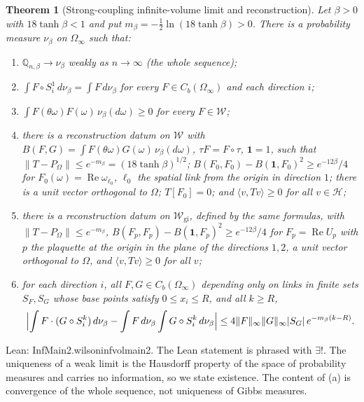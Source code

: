 \documentclass[11pt,a4paper]{article}
\newtheorem{theorem}{Theorem}[section]
\theoremstyle{definition}
\theoremstyle{remark}
\newcommand{\leanus}{\textunderscore\allowbreak{}}
\newcommand{\leandot}{.\allowbreak{}}
\newcommand{\lean}[1]{{\ttfamily\let\_\leanus #1}}
\renewcommand{\Re}{\operatorname{Re}}
\begin{document}
\begin{theorem}[Strong-coupling infinite-volume limit and reconstruction]\label{thm:infvol}
Let $\beta>0$ with $18\tanh\beta<1$ and put $m_\beta=-\tfrac12\ln(18\tanh\beta)>0$. There is a probability measure $\nu_\beta$ on $\Omega_\infty$ such that:
\begin{enumerate}[label=(\alph*),leftmargin=2em]
\item $\mathbb Q_{n,\beta}\to\nu_\beta$ weakly as $n\to\infty$ (the whole sequence);
\item $\int F\circ S_i^1\,d\nu_\beta=\int F\,d\nu_\beta$ for every $F\in C_b(\Omega_\infty)$ and each direction $i$;
\item $\int F(\theta\omega)F(\omega)\,\nu_\beta(d\omega)\ge0$ for every $F\in\mathcal W$;
\item there is a reconstruction datum on $\mathcal W$ with $B(F,G)=\int F(\theta\omega)G(\omega)\,\nu_\beta(d\omega)$, $\tau F=F\circ\tau$, $\mathbf 1=1$, such that $\|T-P_\Omega\|\le e^{-m_\beta}=(18\tanh\beta)^{1/2}$; $B(F_0,F_0)-B(\mathbf 1,F_0)^2\ge e^{-12\beta}/4$ for $F_0(\omega)=\Re\omega_{\ell_0}$, $\ell_0$ the spatial link from the origin in direction $1$; there is a unit vector orthogonal to $\Omega$; $T[F_0]=0$; and $\langle v,Tv\rangle\ge0$ for all $v\in\mathcal H$;
\item there is a reconstruction datum on $\mathcal W_{\mathrm{gi}}$, defined by the same formulas, with $\|T-P_\Omega\|\le e^{-m_\beta}$, $B(F_p,F_p)-B(\mathbf 1,F_p)^2\ge e^{-12\beta}/4$ for $F_p=\Re U_p$ with $p$ the plaquette at the origin in the plane of the directions $1,2$, a unit vector orthogonal to $\Omega$, and $\langle v,Tv\rangle\ge0$ for all $v$;
\item for each direction $i$, all $F,G\in C_b(\Omega_\infty)$ depending only on links in finite sets $S_F,S_G$ whose base points satisfy $0\le x_i\le R$, and all $k\ge R$,
\[
\Bigl|\int F\cdot(G\circ S_i^k)\,d\nu_\beta-\int F\,d\nu_\beta\int G\circ S_i^k\,d\nu_\beta\Bigr|\le4\|F\|_\infty\|G\|_\infty|S_G|\,e^{-m_\beta(k-R)}.
\]
\end{enumerate}
\end{theorem}
Lean: \lean{InfMain2\leandot{}wilson\_infvol\_main2}. The Lean statement is phrased with $\exists!$. The uniqueness of a weak limit is the Hausdorff property of the space of probability measures and carries no information, so we state existence. The content of (a) is convergence of the whole sequence, not uniqueness of Gibbs measures.
\end{document}

